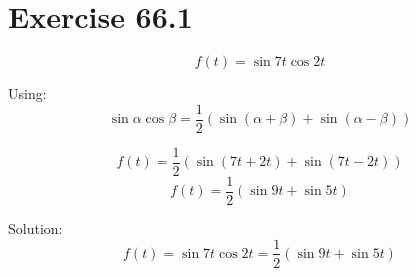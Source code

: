 \documentclass[a4paper, 10pt]{scrartcl}
\begin{document}
\section{Exercise 66.1}

\[f(t) = \sin{7t}\cos{2t}\]

Using:
\[\sin{\alpha}\cos{\beta} = \frac{1}{2}(\sin{(\alpha + \beta)} + \sin{(\alpha - \beta)})\]

\[f(t) = \frac{1}{2}(\sin{(7t + 2t)} + \sin{(7t - 2t)})\]
\[f(t) = \frac{1}{2}(\sin{9t} + \sin{5t})\]

Solution:
\[f(t) = \sin{7t}\cos{2t} = \frac{1}{2}(\sin{9t} + \sin{5t})\]
\end{document}
